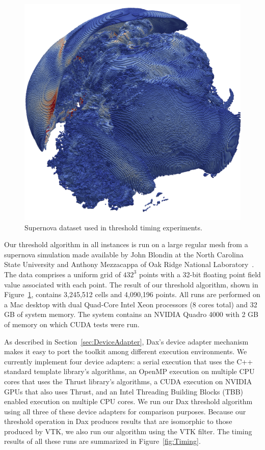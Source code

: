 \documentclass[conference]{IEEEtran}
\newcommand*{\lcite}[1]{~\cite{#1}}
\begin{document}
\begin{figure}[ht]
  \centering
  \includegraphics[width=\linewidth]{images/SupernovaThreshold}
  \caption{Supernova dataset used in threshold timing experiments.}
  \label{fig:Supernova}
\end{figure}

Our threshold algorithm in all instances is run on a large regular mesh
from a supernova simulation made available by John Blondin at the North
Carolina State University and Anthony Mezzacappa of Oak Ridge National
Laboratory\lcite{Blondin2003}.  The data comprises a uniform grid of
$432^3$ points with a 32-bit floating point field value associated with
each point.  The result of our threshold algorithm, shown in
Figure~\ref{fig:Supernova}, contains 3,245,512 cells and 4,090,196 points.
All runs are performed on a Mac desktop with dual Quad-Core Intel Xeon
processors (8 cores total) and 32 GB of system memory.  The system contains
an NVIDIA Quadro 4000 with 2 GB of memory on which CUDA tests were run.

As described in Section~\ref{sec:DeviceAdapter}, Dax's device adapter
mechanism makes it easy to port the toolkit among different execution
environments.  We currently implement four device adapters: a serial
execution that uses the C++ standard template library's algorithms, an
OpenMP execution on multiple CPU cores that uses the Thrust library's
algorithms, a CUDA execution on NVIDIA GPUs that also uses Thrust, and an
Intel Threading Building Blocks (TBB) enabled execution on multiple CPU
cores.  We run our Dax threshold algorithm using all three of these device
adapters for comparison purposes.  Because our threshold operation in Dax
produces results that are isomorphic to those produced by VTK, we also run
our algorithm using the VTK filter.  The timing results of all these runs
are summarized in Figure~\ref{fig:Timing}.
\end{document}
